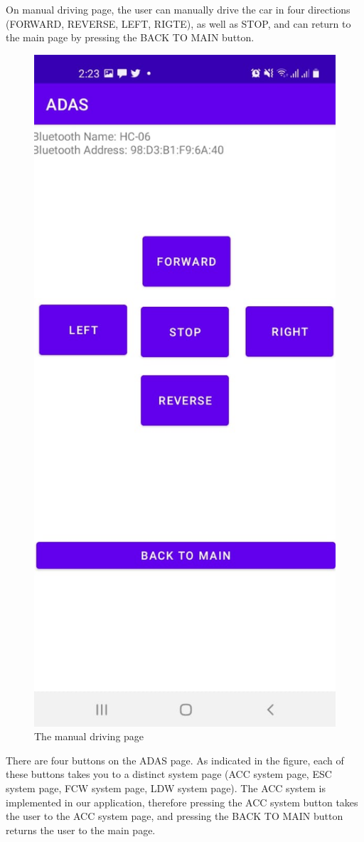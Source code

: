 \documentclass[12pt,a4paper]{report}
\begin{document}
On manual driving page, the user can manually drive the car in four directions (FORWARD, REVERSE, LEFT, RIGTE), as well as STOP, and can return to the main page by pressing the BACK TO MAIN button.
\begin{figure}[H]
    \centering
    \graphicspath{ {./images/} }
    \includegraphics[width=.5\textwidth,height=.5\textheight ]{manual.jpg}
    \caption{The  manual driving page}
    \label{fig:mesh1}
\end{figure}
There are four buttons on the ADAS page. As indicated in the figure, each of these buttons takes you to a distinct system page (ACC system page, ESC system page, FCW system page, LDW system page). The ACC system is implemented in our application, therefore pressing the ACC system button takes the user to the ACC system page, and pressing the BACK TO MAIN button returns the user to the main page.
\end{document}
